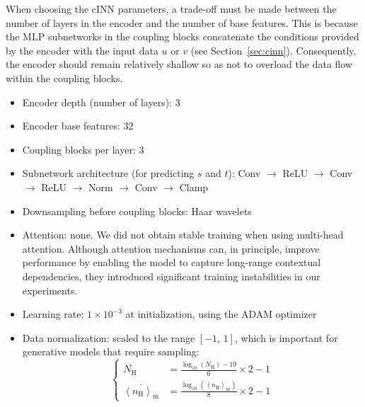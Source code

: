 \documentclass{aa}
\newcommand{\aver}[1]{\ensuremath{\left\langle #1 \right\rangle}}
\newcommand{\nh}{\ensuremath{n_\text{H}}}
\newcommand{\Nh}{\ensuremath{N_\text{H}}}
\newcommand{\nmh}{\ensuremath{\aver{\nh}_{\text{m}}}}
\begin{document}
\begin{appendix}
      When choosing the cINN parameters, a trade-off must be made between the number of layers in the encoder and the number of base features. 
      This is because the MLP subnetworks in the coupling blocks concatenate the conditions provided by the encoder with the input data $u$ or $v$ (see Section~\ref{sec:cinn}). 
      Consequently, the encoder should remain relatively shallow so as not to overload the data flow within the coupling blocks.
      \begin{itemize}
         \item Encoder depth (number of layers): 3
         \item Encoder base features: 32
         \item Coupling blocks per layer: 3
         \item Subnetwork architecture (for predicting $s$ and $t$): Conv $\rightarrow$ ReLU $\rightarrow$ Conv $\rightarrow$ ReLU $\rightarrow$ Norm $\rightarrow$ Conv $\rightarrow$ Clamp
         \item Downsampling before coupling blocks: Haar wavelets
         \item Attention: none. We did not obtain stable training when using multi-head attention. Although attention mechanisms can, in principle, improve performance by enabling the model to capture long-range contextual dependencies, they introduced significant training instabilities in our experiments.
         \item Learning rate: $1\times10^{-3}$ at initialization, using the ADAM optimizer
         \item Data normalization: scaled to the range $[-1,\,1]$, which is important for generative models that require sampling:
            \begin{equation}
               \label{eq:normalization}
               \left\{
               \begin{aligned}
                  \overline{\Nh} &= \frac{\log_{10}(\Nh)-19}{6}\times2-1 \\
                  \overline{\nmh} &= \frac{\log_{10}(\nmh)}{8}\times2-1
               \end{aligned}
               \right.
            \end{equation}
      \end{itemize}

\end{appendix}
\end{document}
